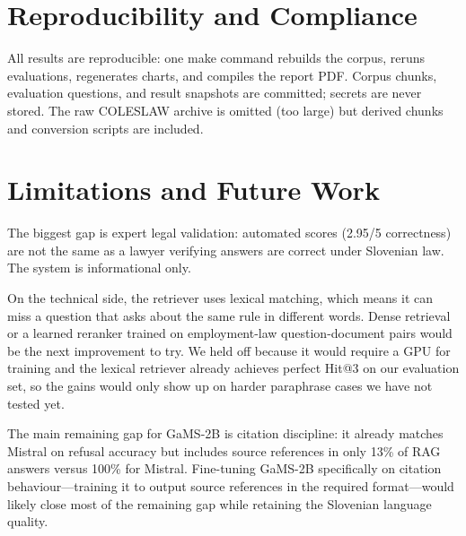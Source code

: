 \documentclass[fleqn,moreauthors,10pt]{ds_report}
\begin{document}
\section*{Reproducibility and Compliance}

All results are reproducible: one make command rebuilds the corpus, reruns evaluations, regenerates charts, and compiles the report PDF.
Corpus chunks, evaluation questions, and result snapshots are committed; secrets are never stored.
The raw COLESLAW archive is omitted (too large) but derived chunks and conversion scripts are included.

\section*{Limitations and Future Work}

The biggest gap is expert legal validation: automated scores (2.95/5 correctness) are not the same as a lawyer verifying answers are correct under Slovenian law.
The system is informational only.

On the technical side, the retriever uses lexical matching, which means it can miss a question that asks about the same rule in different words.
Dense retrieval or a learned reranker trained on employment-law question-document pairs would be the next improvement to try.
We held off because it would require a GPU for training and the lexical retriever already achieves perfect Hit@3 on our evaluation set, so the gains would only show up on harder paraphrase cases we have not tested yet.

The main remaining gap for GaMS-2B is citation discipline: it already matches Mistral on refusal accuracy but includes source references in only 13\% of RAG answers versus 100\% for Mistral.
Fine-tuning GaMS-2B specifically on citation behaviour---training it to output source references in the required format---would likely close most of the remaining gap while retaining the Slovenian language quality.

\clearpage


\end{document}
